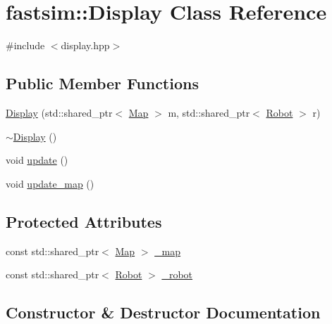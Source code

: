 \hypertarget{classfastsim_1_1_display}{}\section{fastsim\+:\+:Display Class Reference}
\label{classfastsim_1_1_display}


{\ttfamily \#include $<$display.\+hpp$>$}

\subsection*{Public Member Functions}
\begin{DoxyCompactItemize}
\item 
\hyperlink{classfastsim_1_1_display_ac370bc17e1b11d19d7e18714ef4dc813}{Display} (std\+::shared\+\_\+ptr$<$ \hyperlink{classfastsim_1_1_map}{Map} $>$ m, std\+::shared\+\_\+ptr$<$ \hyperlink{classfastsim_1_1_robot}{Robot} $>$ r)
\item 
\hyperlink{classfastsim_1_1_display_afaa5e6853d41afa68ab79bf444c949f7}{$\sim$\+Display} ()
\item 
void \hyperlink{classfastsim_1_1_display_af8735ebfd7f2f5b7c21bdcff8ce61196}{update} ()
\item 
void \hyperlink{classfastsim_1_1_display_a76823e8923740976d640f53efa41bcca}{update\+\_\+map} ()
\end{DoxyCompactItemize}
\subsection*{Protected Attributes}
\begin{DoxyCompactItemize}
\item 
const std\+::shared\+\_\+ptr$<$ \hyperlink{classfastsim_1_1_map}{Map} $>$ \hyperlink{classfastsim_1_1_display_a34666d8cd405aa5fc6fd2abe0082d7ef}{\+\_\+map}
\item 
const std\+::shared\+\_\+ptr$<$ \hyperlink{classfastsim_1_1_robot}{Robot} $>$ \hyperlink{classfastsim_1_1_display_af02c19ccd7536c8972521ae6919c0acf}{\+\_\+robot}
\end{DoxyCompactItemize}


\subsection{Constructor \& Destructor Documentation}
